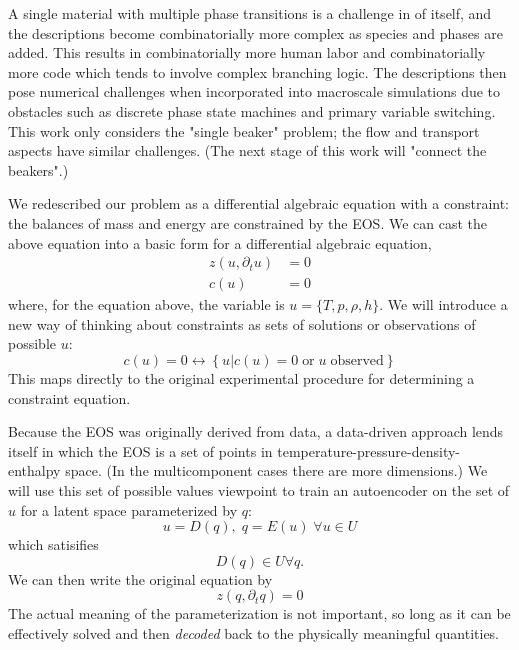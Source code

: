 \documentclass[AMA,STIX1COL]{WileyNJD-v2}
\begin{document}
A single material with multiple phase transitions
is a challenge in of itself, and the descriptions become combinatorially
more complex as species and phases are added. This results in
combinatorially more human labor and combinatorially more code which
tends to involve complex branching logic. The descriptions then pose
numerical challenges when incorporated into macroscale simulations due
to obstacles such as discrete phase state machines and primary variable
switching.
This work only considers the "single beaker" problem; the flow
and transport aspects have similar challenges. (The next stage of this
work will "connect the beakers".)


We redescribed our problem as a differential algebraic equation
with a constraint: the balances of mass and energy are constrained by
the EOS. We can cast the above equation into a basic form for a
differential algebraic equation,
\begin{align}
  z( u, \partial_t u) &= 0 \\
  c(u) & = 0
\end{align}
where, for the equation above, the variable is $u=\{T,p,\rho,h\}$. We will introduce a new way of thinking about constraints as sets of
solutions or observations of possible $u$:
\begin{equation}
c(u)=0 \longleftrightarrow \left\{ u | c(u)=0 \;\text{or}\; u\; \text{observed} \right\}
\end{equation}
This maps directly to the original experimental procedure for
determining a constraint equation.

Because the EOS was originally derived from data, a data-driven
approach lends itself in which the EOS is a set of points in
temperature-pressure-density-enthalpy space. (In the multicomponent
cases there are more dimensions.)
We will use this set of possible values viewpoint to train an
autoencoder on the set of $u$ for a latent space parameterized by $q$:
\begin{equation}
u = D(q), \; q=E(u) \;\forall u \in U
\end{equation}
which satisifies
\begin{equation}
  D(q)\in U \forall q.
\end{equation}
We can then write the original equation by
\begin{equation}
z(q,\partial_t q)=0
\end{equation}
The actual meaning of the parameterization is not important, so long as
it can be effectively solved and then \emph{decoded} back to the
physically meaningful quantities.
\end{document}
